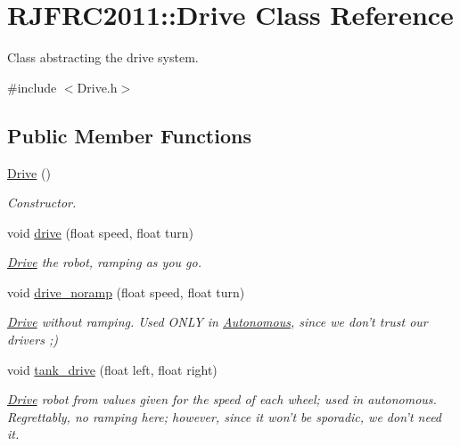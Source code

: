 \hypertarget{class_r_j_f_r_c2011_1_1_drive}{
\section{RJFRC2011::Drive Class Reference}
\label{class_r_j_f_r_c2011_1_1_drive}
}


Class abstracting the drive system.  




{\ttfamily \#include $<$Drive.h$>$}

\subsection*{Public Member Functions}
\begin{DoxyCompactItemize}
\item 
\hyperlink{class_r_j_f_r_c2011_1_1_drive_a6633c3e2ff4c7d3803a1b87947d872a3}{Drive} ()
\begin{DoxyCompactList}\small\item\em Constructor. \item\end{DoxyCompactList}\item 
void \hyperlink{class_r_j_f_r_c2011_1_1_drive_aa246cbe7cdecc4e72af60d5d9a87bcdb}{drive} (float speed, float turn)
\begin{DoxyCompactList}\small\item\em \hyperlink{class_r_j_f_r_c2011_1_1_drive}{Drive} the robot, ramping as you go. \item\end{DoxyCompactList}\item 
void \hyperlink{class_r_j_f_r_c2011_1_1_drive_a033624d88429de64fe3d954680157c44}{drive\_\-noramp} (float speed, float turn)
\begin{DoxyCompactList}\small\item\em \hyperlink{class_r_j_f_r_c2011_1_1_drive}{Drive} without ramping. Used ONLY in \hyperlink{class_r_j_f_r_c2011_1_1_autonomous}{Autonomous}, since we don't trust our drivers ;) \item\end{DoxyCompactList}\item 
void \hyperlink{class_r_j_f_r_c2011_1_1_drive_a731a3b7d782c3f75287b97db93f489d6}{tank\_\-drive} (float left, float right)
\begin{DoxyCompactList}\small\item\em \hyperlink{class_r_j_f_r_c2011_1_1_drive}{Drive} robot from values given for the speed of each wheel; used in autonomous. Regrettably, no ramping here; however, since it won't be sporadic, we don't need it. \item\end{DoxyCompactList}\item 

\end{DoxyCompactItemize}
